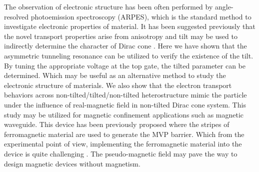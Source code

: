     The observation of electronic structure has been often performed by angle-resolved photoemission spectroscopy (ARPES), which is the standard method to investigate electronic properties of material. 
    It has been suggested previously that the novel transport properties arise from anisotropy and tilt may be used to indirectly determine the character of Dirac cone \cite{Zhang2018b}. 
    Here we have shown that the asymmetric tunneling resonance can be utilized to verify the existence of the tilt. 
    By tuning the appropriate voltage at the top gate, the tilted parameter can be determined. 
    Which may be useful as an alternative method to study the electronic structure of materials. 
    We also show that the electron transport behaviors across non-tilted/tilted/non-tilted heterostructure mimic the particle under the influence of real-magnetic field in non-tilted Dirac cone system. 
    This study may be utilized for magnetic confinement applications such as magnetic waveguide. 
    This device has been previously proposed where the stripes of ferromagnetic material are used to generate the MVP barrier. 
    Which from the experimental point of view, implementing the ferromagnetic material into the device is quite challenging \cite{Awschalom2009}. 
    The pseudo-magnetic field may pave the way to design magnetic devices without magnetism. 